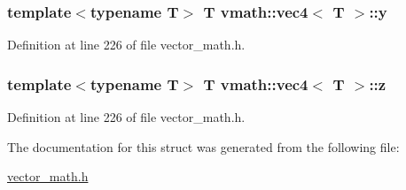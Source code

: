 \hypertarget{structvmath_1_1vec4_a49b993a66463b01b7e6bc1b69326f51b}{
\subsubsection[{y}]{\setlength{\rightskip}{0pt plus 5cm}template$<$typename T$>$ T {\bf vmath\-::vec4}$<$ T $>$\-::y}}\label{structvmath_1_1vec4_a49b993a66463b01b7e6bc1b69326f51b}


Definition at line 226 of file vector\-\_\-math.\-h.

\hypertarget{structvmath_1_1vec4_ad4cca05756c717809fcb75175ca48da3}{
\subsubsection[{z}]{\setlength{\rightskip}{0pt plus 5cm}template$<$typename T$>$ T {\bf vmath\-::vec4}$<$ T $>$\-::z}}\label{structvmath_1_1vec4_ad4cca05756c717809fcb75175ca48da3}


Definition at line 226 of file vector\-\_\-math.\-h.



The documentation for this struct was generated from the following file\-:\begin{DoxyCompactItemize}
\item 
\hyperlink{vector__math_8h}{vector\-\_\-math.\-h}\end{DoxyCompactItemize}
